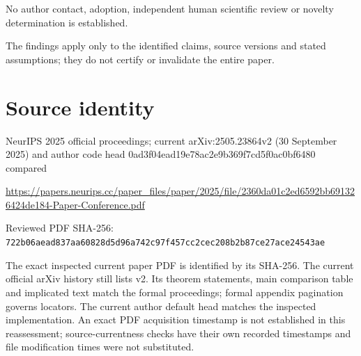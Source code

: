 \documentclass[11pt]{article}
\begin{document}
No author contact, adoption, independent human scientific review or novelty determination is established.\par

The findings apply only to the identified claims, source versions and stated assumptions; they do not certify or invalidate the entire paper.\par

\section*{Source identity}

NeurIPS 2025 official proceedings; current arXiv:2505.23864v2 (30 September 2025) and author code head 0ad3f04ead19e78ac2e9b369f7cd5f0ac0bf6480 compared

\url{https://papers.neurips.cc/paper_files/paper/2025/file/2360da01c2ed6592bb691326424de184-Paper-Conference.pdf}

Reviewed PDF SHA-256: \nolinkurl{722b06aead837aa60828d5d96a742c97f457cc2cec208b2b87ce27ace24543ae}

The exact inspected current paper PDF is identified by its SHA-256. The current official arXiv history still lists v2. Its theorem statements, main comparison table and implicated text match the formal proceedings; formal appendix pagination governs locators. The current author default head matches the inspected implementation. An exact PDF acquisition timestamp is not established in this reassessment; source-currentness checks have their own recorded timestamps and file modification times were not substituted.
\end{document}
